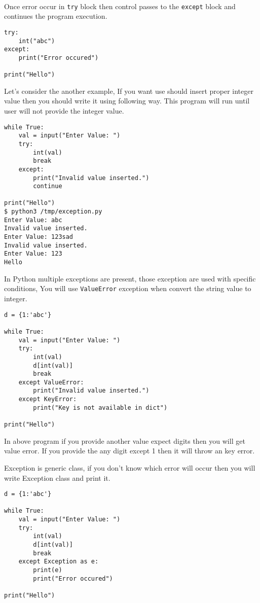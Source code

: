 \documentclass[letterpaper,12pt]{book}
\begin{document}
\paragraph{}
Once error occur in \texttt{try} block then control passes to the \texttt{except} block and continues the program execution.
\begin{lstlisting}
try:
    int("abc")
except:
    print("Error occured")

print("Hello")
\end{lstlisting}

Let's consider the another example, If you want use should insert proper integer value then you should write it using following way. This program will run until user will not provide the integer value.
\begin{lstlisting}
while True:
    val = input("Enter Value: ")
    try:
        int(val)
        break
    except:
        print("Invalid value inserted.")
        continue

print("Hello")
$ python3 /tmp/exception.py
Enter Value: abc
Invalid value inserted.
Enter Value: 123sad
Invalid value inserted.
Enter Value: 123
Hello
\end{lstlisting}

In Python multiple exceptions are present, those exception are used with specific conditions, You will use \texttt{ValueError} exception when convert the string value to integer.
\begin{lstlisting}
d = {1:'abc'}

while True:
    val = input("Enter Value: ")
    try:
        int(val)
        d[int(val)]
        break
    except ValueError:
        print("Invalid value inserted.")
    except KeyError:
        print("Key is not available in dict")

print("Hello")
\end{lstlisting}
In above program if you provide another value expect digits then you will get value error. If you provide the any digit except 1 then it will throw an key error.

Exception is generic class, if you don't know which error will occur then you will write Exception class and print it.
\begin{lstlisting}
d = {1:'abc'}

while True:
    val = input("Enter Value: ")
    try:
        int(val)
        d[int(val)]
        break
    except Exception as e:
        print(e)
        print("Error occured")

print("Hello")
\end{lstlisting}
\end{document}
